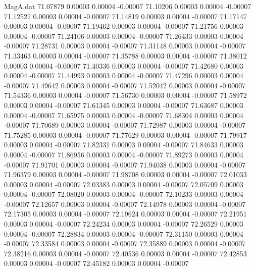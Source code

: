 \begin{filecontents}{MagA.dat}
  71.07879    0.00003    0.00004   -0.00007
  71.10206    0.00003    0.00004   -0.00007
  71.12527    0.00003    0.00004   -0.00007
  71.14819    0.00003    0.00004   -0.00007
  71.17147    0.00003    0.00004   -0.00007
  71.19462    0.00003    0.00004   -0.00007
  71.21756    0.00003    0.00004   -0.00007
  71.24106    0.00003    0.00004   -0.00007
  71.26433    0.00003    0.00004   -0.00007
  71.28731    0.00003    0.00004   -0.00007
  71.31148    0.00003    0.00004   -0.00007
  71.33463    0.00003    0.00004   -0.00007
  71.35788    0.00003    0.00004   -0.00007
  71.38012    0.00003    0.00004   -0.00007
  71.40336    0.00003    0.00004   -0.00007
  71.42680    0.00003    0.00004   -0.00007
  71.44993    0.00003    0.00004   -0.00007
  71.47296    0.00003    0.00004   -0.00007
  71.49642    0.00003    0.00004   -0.00007
  71.52042    0.00003    0.00004   -0.00007
  71.54336    0.00003    0.00004   -0.00007
  71.56730    0.00003    0.00004   -0.00007
  71.58972    0.00003    0.00004   -0.00007
  71.61345    0.00003    0.00004   -0.00007
  71.63687    0.00003    0.00004   -0.00007
  71.65975    0.00003    0.00004   -0.00007
  71.68304    0.00003    0.00004   -0.00007
  71.70689    0.00003    0.00004   -0.00007
  71.72987    0.00003    0.00004   -0.00007
  71.75285    0.00003    0.00004   -0.00007
  71.77629    0.00003    0.00004   -0.00007
  71.79917    0.00003    0.00004   -0.00007
  71.82331    0.00003    0.00004   -0.00007
  71.84633    0.00003    0.00004   -0.00007
  71.86956    0.00003    0.00004   -0.00007
  71.89273    0.00003    0.00004   -0.00007
  71.91701    0.00003    0.00004   -0.00007
  71.94038    0.00003    0.00004   -0.00007
  71.96379    0.00003    0.00004   -0.00007
  71.98708    0.00003    0.00004   -0.00007
  72.01033    0.00003    0.00004   -0.00007
  72.03383    0.00003    0.00004   -0.00007
  72.05709    0.00003    0.00004   -0.00007
  72.08020    0.00003    0.00004   -0.00007
  72.10233    0.00003    0.00004   -0.00007
  72.12657    0.00003    0.00004   -0.00007
  72.14978    0.00003    0.00004   -0.00007
  72.17305    0.00003    0.00004   -0.00007
  72.19624    0.00003    0.00004   -0.00007
  72.21951    0.00003    0.00004   -0.00007
  72.24234    0.00003    0.00004   -0.00007
  72.26529    0.00003    0.00004   -0.00007
  72.28834    0.00003    0.00004   -0.00007
  72.31150    0.00003    0.00004   -0.00007
  72.33584    0.00003    0.00004   -0.00007
  72.35889    0.00003    0.00004   -0.00007
  72.38216    0.00003    0.00004   -0.00007
  72.40536    0.00003    0.00004   -0.00007
  72.42853    0.00003    0.00004   -0.00007
  72.45182    0.00003    0.00004   -0.00007

\end{filecontents}
